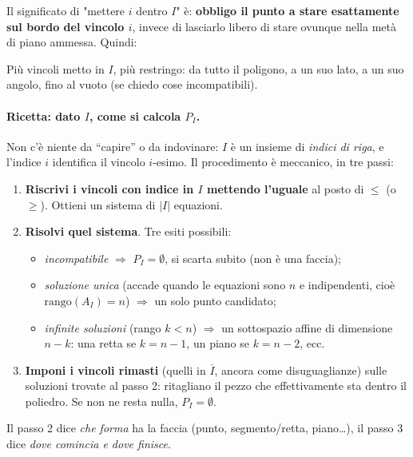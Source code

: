 \documentclass[12pt]{extarticle} %
\begin{document}
\medskip
\noindent Il significato di "mettere $i$ dentro $I$" è: \textbf{obbligo il punto a stare esattamente sul bordo del vincolo $i$}, invece di lasciarlo libero di stare ovunque nella metà di piano ammessa. Quindi:
\begin{center}
\end{center}
Più vincoli metto in $I$, più restringo: da tutto il poligono, a un suo lato, a un suo angolo, fino al vuoto (se chiedo cose incompatibili).

\paragraph{Ricetta: dato $I$, come si calcola $P_I$.}
Non c'è niente da ``capire'' o da indovinare: $I$ è un insieme di \emph{indici di riga}, e l'indice $i$ identifica il vincolo $i$-esimo. Il procedimento è meccanico, in tre passi:

\begin{enumerate}
    \item \textbf{Riscrivi i vincoli con indice in $I$ mettendo l'uguale} al posto di $\le$ (o $\ge$). Ottieni un sistema di $|I|$ equazioni.
    \item \textbf{Risolvi quel sistema}. Tre esiti possibili:
    \begin{itemize}
        \item \emph{incompatibile} $\Rightarrow$ $P_I = \emptyset$, si scarta subito (non è una faccia);
        \item \emph{soluzione unica} (accade quando le equazioni sono $n$ e indipendenti, cioè $\text{rango}(A_I)=n$) $\Rightarrow$ un solo punto candidato;
        \item \emph{infinite soluzioni} (rango $k<n$) $\Rightarrow$ un sottospazio affine di dimensione $n-k$: una retta se $k=n-1$, un piano se $k=n-2$, ecc.
    \end{itemize}
    \item \textbf{Imponi i vincoli rimasti} (quelli in $\overline{I}$, ancora come disuguaglianze) sulle soluzioni trovate al passo 2: ritagliano il pezzo che effettivamente sta dentro il poliedro. Se non ne resta nulla, $P_I=\emptyset$.
\end{enumerate}
Il passo 2 dice \emph{che forma} ha la faccia (punto, segmento/retta, piano\dots), il passo 3 dice \emph{dove comincia e dove finisce}.
\end{document}

